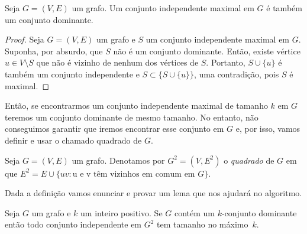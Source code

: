 \begin{lemma}\label{lemma:2.8}
    Seja $G = (V,E)$ um grafo. Um conjunto independente maximal em $G$ é também um conjunto dominante.
\end{lemma}
\begin{proof}
    Seja $G = (V,E)$ um grafo e $S$ um conjunto independente maximal em $G$. Suponha, por absurdo, que $S$ não é um conjunto dominante. Então, existe vértice $u \in V \setminus S$ que não é vizinho de nenhum dos vértices de $S$. Portanto, $S \cup \{u\}$ é também um conjunto independente e $S \subset \{S \cup \{u\}\}$, uma contradição, pois $S$ é maximal.
\end{proof}
Então, se encontrarmos um conjunto independente maximal de tamanho $k$ em $G$ teremos um conjunto dominante de mesmo tamanho. No entanto, não conseguimos garantir que iremos encontrar esse conjunto em $G$ e, por isso, vamos definir e usar o chamado quadrado de $G$.
\begin{definition}
    Seja $G= (V,E)$ um grafo. Denotamos por $G^2 = (V,E^2)$ o \emph{quadrado} de $G$ em que $E^2 = E \cup \{uv: \text{u e v têm vizinhos em comum em $G$}\}$.
\end{definition}
Dada a definição vamos enunciar e provar um lema que nos ajudará no algoritmo.
\begin{lemma}\label{lemma:2.10}
    Seja $G$ um grafo e $k$ um inteiro positivo. Se $G$ contém um $k$-conjunto dominante então todo conjunto independente em $G^2$ tem tamanho no máximo~$k$.
\end{lemma}
